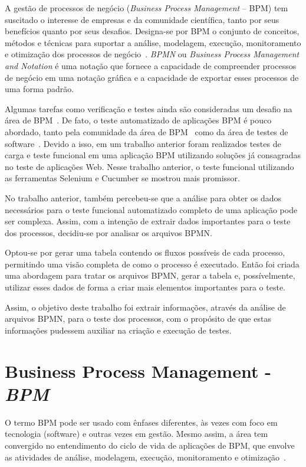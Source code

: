 \documentclass[12pt]{article}
\begin{document}
A gestão de processos de negócio (\emph{Business Process Management} -- BPM) tem suscitado o interesse de empresas e da comunidade científica, tanto por seus benefícios quanto por seus desafios. Designa-se por BPM o conjunto de conceitos, métodos e técnicas para suportar a análise, modelagem, execução, monitoramento e otimização dos processos de negócio~\cite{weske}. \emph{BPMN} ou \emph{Business Process Management and Notation} é uma notação que fornece a capacidade de compreender processos de negócio em uma notação gráfica e a capacidade de exportar esses processos de uma forma padrão\cite{bpmn}.

Algumas tarefas como verificação e testes ainda são consideradas um desafio na área de BPM~\cite{aalst2013survey}. De fato, o teste automatizado de aplicações BPM é pouco abordado, tanto pela comunidade da área de BPM~\cite{weske} como da área de testes de software~\cite{graham2012experiences}. Devido a isso, em um trabalho anterior \cite{sbqs2015} foram realizados testes de carga e teste funcional em uma aplicação BPM utilizando soluções já consagradas no teste de aplicações Web. Nesse trabalho anterior, o teste funcional utilizando as ferramentas Selenium e Cucumber se mostrou mais promissor.

No trabalho anterior, também percebeu-se que a análise para obter os dados necessários para o teste funcional automatizado completo de uma aplicação pode ser complexa. Assim, com a intenção de extrair dados importantes para o teste dos processos, decidiu-se por analisar os arquivos BPMN. 

Optou-se por gerar uma tabela contendo os fluxos possíveis de cada processo, permitindo uma visão completa de como o processo é executado. Então foi criada uma abordagem para tratar os arquivos BPMN, gerar a tabela e, possívelmente, utilizar esses dados de forma a criar mais elementos importantes para o teste.

Assim, o objetivo deste trabalho foi extrair informações, através da análise de arquivos BPMN, para o teste dos processos, com o propósito de que estas informações pudessem auxiliar na criação e execução de testes. 

\section{Business Process Management - \emph{BPM}}

O termo BPM pode ser usado com ênfases diferentes, às vezes com foco em tecnologia (software) e outras vezes em gestão. Mesmo assim, a área tem convergido no entendimento do ciclo de vida de aplicações de BPM, que envolve as atividades de análise, modelagem, execução, monitoramento e otimização~\cite{ABPMP}. 
\end{document}
